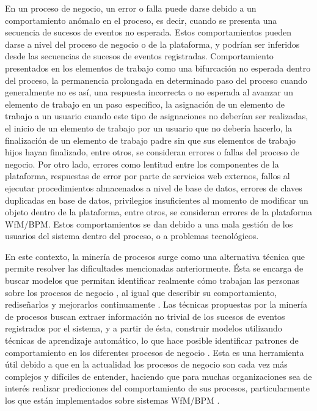 En un proceso de negocio, un error o falla puede darse debido a un comportamiento anómalo en el proceso, es decir, cuando se presenta una secuencia de sucesos de eventos no esperada. Estos comportamientos pueden darse a nivel del proceso de negocio o de la plataforma, y podrían ser inferidos desde las secuencias de sucesos de eventos registradas. Comportamiento presentados en los elementos de trabajo como una bifurcación no esperada dentro del proceso, la permanencia prolongada en determinado paso del proceso cuando generalmente no es así, una respuesta incorrecta o no esperada al avanzar un elemento de trabajo en un paso específico, la asignación de un elemento de trabajo a un usuario cuando este tipo de asignaciones no deberían ser realizadas, el inicio de un elemento de trabajo por un usuario que no debería hacerlo, la finalización de un elemento de trabajo padre sin que sus elementos de trabajo hijos hayan finalizado, entre otros, se consideran errores o fallas del proceso de negocio. Por otro lado, errores como lentitud entre los componentes de la plataforma, respuestas de error por parte de servicios web externos, fallos al ejecutar procedimientos almacenados a nivel de base de datos, errores de claves duplicadas en base de datos, privilegios insuficientes al momento de modificar un objeto dentro de la plataforma, entre otros, se consideran errores de la plataforma WfM/BPM. Estos comportamientos se dan debido a una mala gestión de los usuarios del sistema dentro del proceso, o a problemas tecnológicos.

En este contexto, la minería de procesos surge como una alternativa técnica que permite resolver las dificultades mencionadas anteriormente. Ésta se encarga de buscar modelos que permitan identificar realmente cómo trabajan las personas sobre los procesos de negocio \cite{VanDerAalst2004_2}, al igual que describir su comportamiento, rediseñarlos y mejorarlos continuamente \cite{VanderAalst2007}. Las técnicas propuestas por la minería de procesos buscan extraer información no trivial de los sucesos de eventos registrados por el sistema, y a partir de ésta, construir modelos utilizando técnicas de aprendizaje automático, lo que hace posible identificar patrones de comportamiento en los diferentes procesos de negocio \cite{VanderAalst2007,VanDerAalst2011}. Esta es una herramienta útil debido a que en la actualidad los procesos de negocio son cada vez más complejos y difíciles de entender, haciendo que para muchas organizaciones sea de interés realizar predicciones del comportamiento de sus procesos, particularmente los que están implementados sobre sistemas WfM/BPM \cite{Pandey2011}.


